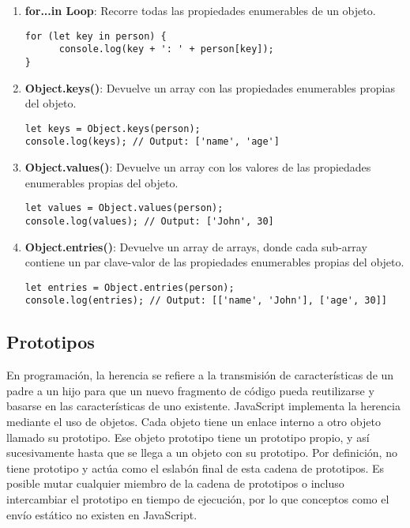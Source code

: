 \documentclass{article}
\begin{document}
\begin{enumerate}
      \item \textbf{for...in Loop}: Recorre todas las propiedades enumerables de un objeto.
\begin{lstlisting}
for (let key in person) {
      console.log(key + ': ' + person[key]);
}
\end{lstlisting}

      \item \textbf{Object.keys()}: Devuelve un array con las propiedades enumerables propias del objeto.
\begin{lstlisting}
let keys = Object.keys(person);
console.log(keys); // Output: ['name', 'age']
\end{lstlisting}

      \item \textbf{Object.values()}: Devuelve un array con los valores de las propiedades enumerables propias del objeto.
\begin{lstlisting}
let values = Object.values(person);
console.log(values); // Output: ['John', 30]
\end{lstlisting}

      \item \textbf{ Object.entries()}: Devuelve un array de arrays, donde cada sub-array contiene un par clave-valor de las propiedades enumerables propias del objeto.
\begin{lstlisting}
let entries = Object.entries(person);
console.log(entries); // Output: [['name', 'John'], ['age', 30]]
\end{lstlisting}
\end{enumerate}


\subsection{Prototipos}

En programación, la herencia se refiere a la transmisión de características de un padre a un hijo para que un nuevo fragmento de código pueda reutilizarse
y basarse en las características de uno existente. JavaScript implementa la herencia mediante el uso de objetos. Cada objeto tiene un enlace interno a otro
objeto llamado su prototipo. Ese objeto prototipo tiene un prototipo propio, y así sucesivamente hasta que se llega a un objeto con su prototipo. Por definición,
no tiene prototipo y actúa como el eslabón final de esta cadena de prototipos. Es posible mutar cualquier miembro de la cadena de prototipos o incluso intercambiar
el prototipo en tiempo de ejecución, por lo que conceptos como el envío estático no existen en JavaScript.
\end{document}
